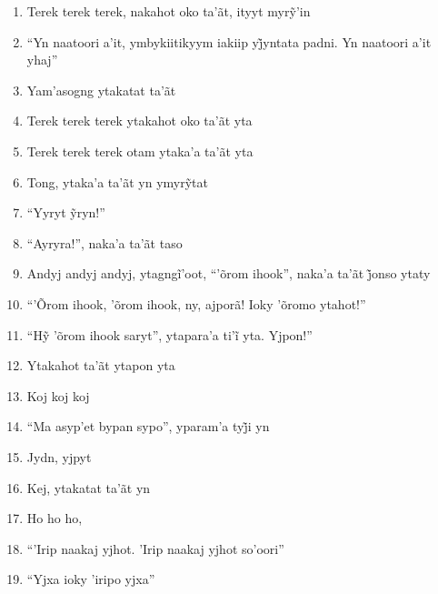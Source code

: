 \begin{enumerate}
 \item Terek terek terek, nakahot oko ta’ãt, ityyt myrỹ’in

 \item ``Yn naatoori a’it, ymbykiitikyym iakiip yj̃yntata padni. Yn naatoori a’it yhaj''

 \item Yam'asogng ytakatat ta'ãt

 \begin{center}\end{center}

 \item Terek terek terek ytakahot oko ta'ãt yta

 \item Terek terek terek otam ytaka'a ta'ãt yta

 \item Tong, ytaka’a ta’ãt yn ymyrỹtat

 \item ``Yyryt ỹryn!''

 \item ``Ayryra!'', naka'a ta'ãt taso

 \item Andyj andyj andyj, ytagngĩ’oot, ``’õrom ihook'', naka’a ta’ãt j̃onso ytaty

 \item ``'Õrom ihook, 'õrom ihook, ny, ajporã! Ioky 'õromo ytahot!''

 \item ``Hỹ ’õrom ihook saryt'', ytapara’a ti’ĩ yta. Yjpon!''

 \item Ytakahot ta'ãt ytapon yta

 \item Koj koj koj

 \item ``Ma asyp’et bypan sypo'', yparam’a tyj̃i yn

 \item Jydn, yjpyt

 \item Kej, ytakatat ta'ãt yn

 \begin{center}\end{center}

 \item Ho ho ho,

 \item ``'Irip naakaj yjhot. 'Irip naakaj yjhot so'oori''

 \item ``Yjxa ioky 'iripo yjxa''


\end{enumerate}
